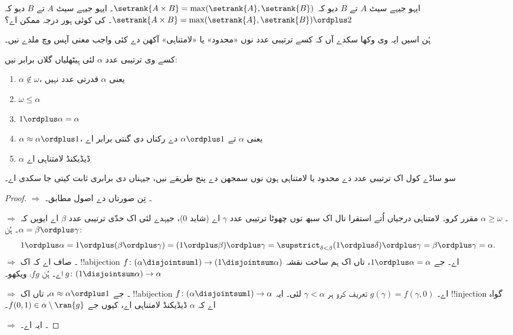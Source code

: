 \documentclass[../../../include/open-logic-section]{subfiles}
\begin{document}
\begin{prob}
ایہو جیہے سیٹ $A$ تے $B$ دیو کہ $\setrank{A \times B}=
\max(\setrank{A}, \setrank{B})$۔ ایہو جیہے سیٹ $A$ تے $B$ دیو کہ
$\setrank{A \times B} = \max(\setrank{A}, \setrank{B}) \ordplus  2$۔
کی کوئی ہور درجہ ممکن اے؟
\end{prob}

ہُن اسیں ایہ وی وکھا سکدے آں کہ کسے ترتیبی عدد نوں «محدود» یا «لامتناہی» آکھن دے کئی واجب معنی آپس وچ ملدے نیں۔

\begin{lem}
کسے وی ترتیبی عدد $\alpha$ لئی ہِیٹھلیاں گلاں برابر نیں:
\begin{enumerate}
	\item{} $\alpha\notin \omega$، یعنی
	$\alpha$ قدرتی عدد نہیں
	\item{} $\omega \leq \alpha$
	\item{} $1 \ordplus  \alpha = \alpha$
	\item{} $\alpha \approx \alpha\ordplus 1$،
	یعنی $\alpha$ تے $\alpha\ordplus 1$ دے رکناں دی گنتی برابر اے
	\item{} $\alpha$ ڈیڈیکنڈ لامتناہی اے
	\end{enumerate}
\end{lem}
\noindent
سو ساڈے کول اک ترتیبی عدد دے محدود یا لامتناہی ہون نوں سمجھن دے پنج طریقے نیں، جیہناں دی برابری ثابت کیتی جا سکدی اے۔

\begin{proof}
\emph{ $\Rightarrow$ ۔}
تِن صورتاں دے اصول مطابق۔

\emph{ $\Rightarrow$ ۔}
$\alpha \geq \omega$ مقرر کرو۔ لامتناہی درجیاں اُتے استقرا نال اک سبھ توں چھوٹا ترتیبی عدد $\gamma$ اے (شاید $0$)، جیہدے لئی اک حدّی ترتیبی عدد $\beta$ اے ایویں کہ $\alpha = \beta \ordplus \gamma$۔ ہُن:
\[
	1 \ordplus \alpha =
	1 \ordplus (\beta \ordplus \gamma) =
	(1 \ordplus \beta) \ordplus \gamma =
	\supstrict_{\delta < \beta} (1 \ordplus  \delta) \ordplus  \gamma =
	\beta \ordplus  \gamma =
	\alpha.
\]
\emph{ $\Rightarrow$ ۔}
صاف اے کہ اک !!a{bijection} $f \colon (\alpha \disjointsum 1) \to (1
\disjointsum \alpha)$ اے۔ جے $1 \ordplus \alpha = \alpha$، تاں اک ہم ساخت نقشہ $g \colon (1 \disjointsum \alpha) \to \alpha$ اے۔ ہُن $\comp{f}{g}$ ویکھو۔

\emph{ $\Rightarrow$ ۔}
جے $\alpha \approx \alpha \ordplus 1$، تاں اک !!a{bijection} $f \colon
(\alpha \disjointsum 1) \to \alpha$ اے۔ $g(\gamma) = f(\gamma, 0)$ تعریف کرو ہر $\gamma < \alpha$ لئی۔ ایہ !!{injection} گواہ اے کہ $\alpha$ ڈیڈیکنڈ لامتناہی اے، کیوں جے $f(0,1) \in \alpha \setminus \ran{g}$۔

\emph{ $\Rightarrow$ ۔}
ایہ  اے۔
\end{proof}
\end{document}
